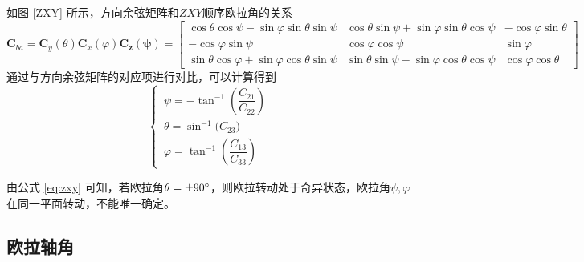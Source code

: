 
如图 \ref{ZXY} 所示，方向余弦矩阵和$ZXY$顺序欧拉角的关系
\begin{equation}
	\bm{C}_{ba} = \bm{C}_y(\theta)\bm{C}_x(\varphi)\bm{C_z(\psi)} =
	\begin{bmatrix}
		\cos \theta \cos \psi - \sin \varphi \sin \theta \sin \psi & \cos \theta \sin \psi + \sin \varphi \sin \theta \cos \psi & -\cos \varphi \sin \theta \\
		-\cos \varphi \sin \psi & \cos \varphi \cos \psi & \sin \varphi \\
		\sin \theta \cos \varphi + \sin \varphi \cos \theta \sin \psi & \sin \theta \sin \psi - \sin \varphi \cos \theta \cos \psi & \cos \varphi \cos \theta 
	\end{bmatrix}
\end{equation}
通过与方向余弦矩阵的对应项进行对比，可以计算得到
\begin{equation}
	\begin{cases}
		\, \psi = -\tan^{-1}\left( \dfrac{C_{21}}{C_{22}} \right) \\
		\, \theta = \sin^{-1}\big( C_{23} \big) \\
		\, \varphi = \tan^{-1} \left( \dfrac{C_{13}}{C_{33}} \right)
	\end{cases}
	\label{eq:zxy}
\end{equation}

由公式 \eqref{eq:zxy} 可知，若欧拉角$\theta = \pm 90 {}^{\circ}$，则欧拉转动处于奇异状态，欧拉角$\psi, \varphi$在同一平面转动，不能唯一确定。
\vspace*{0.5em}



\subsection{欧拉轴角}
\label{sec: 欧拉轴角}
\vspace*{-1.5em}




